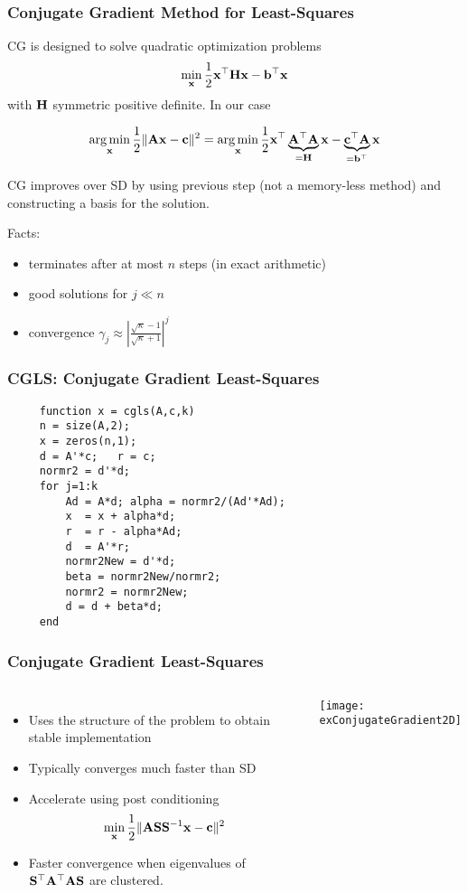 \documentclass[12pt,fleqn]{beamer}
\begin{document}
\begin{frame}\frametitle{Conjugate Gradient Method for Least-Squares}

CG is designed to solve quadratic optimization problems 
$$\min_{\bf x} {\frac 12} {\bf x}^{\top} {\bf H} {\bf x} - {\bf b}^{\top} {\bf x}$$
with ${\bf H}$ symmetric positive definite. In our case

$$ \operatorname*{arg\,min}_{\bf x} {\frac 12} \|{\bf A}{\bf x} - {\bf c}\|^2 = \operatorname*{arg\,min}_{\bf x} {\frac 12} {\bf x}^{\top} \underbrace{{\bf A}^{\top}{\bf A}}_{={\bf H}} {\bf x} - \underbrace{{\bf c}^{\top}{\bf A}}_{={\bf b}^\top}{\bf x} $$

\bigskip
 

CG improves over SD by using previous step (not a memory-less method) and constructing a basis for the solution.

\bigskip

Facts:
\begin{itemize}
	\item terminates after at most $n$ steps (in exact arithmetic)
	\item good solutions for $j\ll n$ 
	\item convergence
	$ \gamma_j \approx \left| {\frac {\sqrt{\kappa}-1}{\sqrt{\kappa}+1}} \right|^j $
\end{itemize}


\end{frame}

\begin{frame}[fragile]
	\frametitle{CGLS: Conjugate Gradient Least-Squares}
\begin{verbatim}
     function x = cgls(A,c,k)
     n = size(A,2);
     x = zeros(n,1);
     d = A'*c;   r = c;
     normr2 = d'*d;
     for j=1:k
         Ad = A*d; alpha = normr2/(Ad'*Ad);
         x  = x + alpha*d;
         r  = r - alpha*Ad;
         d  = A'*r;
         normr2New = d'*d;
         beta = normr2New/normr2;
         normr2 = normr2New;
         d = d + beta*d;
     end
\end{verbatim}



\end{frame}

\begin{frame}
	\frametitle{Conjugate Gradient Least-Squares}
\begin{columns}
	\begin{itemize}
	\item
	Uses the structure of the problem to obtain stable implementation
	\item
	Typically converges much faster than SD
	\item 
	Accelerate using post conditioning
	$$ \min_{\bf x} {\frac 12} \|{\bf A} {\bf S} {\bf S}^{-1} {\bf x} - {\bf c}\|^2$$
	\item 
	Faster convergence when eigenvalues of ${\bf S}^{\top} {\bf A}^{\top} {\bf A} {\bf S}$ are clustered.
	\end{itemize}
	
		
	\texttt{[image: exConjugateGradient2D]}
\end{columns}
\end{frame}
\end{document}
